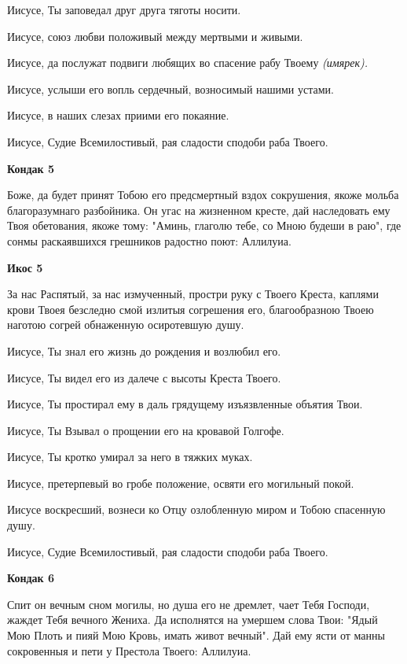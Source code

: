 Иисусе, Ты заповедал друг друга тяготы носити. 


Иисусе, союз любви положивый между мертвыми и живыми. 


Иисусе, да послужат подвиги любящих во спасение рабу Твоему \itshape (имярек)\normalfont{}. 


Иисусе, услыши его вопль сердечный, возносимый нашими устами. 


Иисусе, в наших слезах приими его покаяние. 


Иисусе, Судие Всемилостивый, рая сладости сподоби раба Твоего.




\bfseries Кондак 5\normalfont{}


Боже, да будет принят Тобою его предсмертный вздох сокрушения, якоже мольба благоразумнаго разбойника. Он угас на жизненном кресте, дай наследовать ему Твоя обетования, якоже тому: "Аминь, глаголю тебе, со Мною будеши в раю", где сонмы раскаявшихся грешников радостно поют: Аллилуиа.




\bfseries Икос 5\normalfont{}


За нас Распятый, за нас измученный, простри руку с Твоего Креста, каплями крови Твоея безследно смой излитыя согрешения его, благообразною Твоею наготою согрей обнаженную осиротевшую душу. 


Иисусе, Ты знал его жизнь до рождения и возлюбил его. 


Иисусе, Ты видел его из далече с высоты Креста Твоего. 


Иисусе, Ты простирал ему в даль грядущему изъязвленные объятия Твои. 


Иисусе, Ты Взывал о прощении его на кровавой Голгофе. 


Иисусе, Ты кротко умирал за него в тяжких муках. 


Иисусе, претерпевый во гробе положение, освяти его могильный покой. 


Иисусе воскресший, вознеси ко Отцу озлобленную миром и Тобою спасенную душу. 


Иисусе, Судие Всемилостивый, рая сладости сподоби раба Твоего.




\bfseries Кондак 6\normalfont{}


Спит он вечным сном могилы, но душа его не дремлет, чает Тебя Господи, жаждет Тебя вечного Жениха. Да исполнятся на умершем слова Твои: "Ядый Мою Плоть и пияй Мою Кровь, имать живот вечный". Дай ему ясти от манны сокровенныя и пети у Престола Твоего: Аллилуиа.




